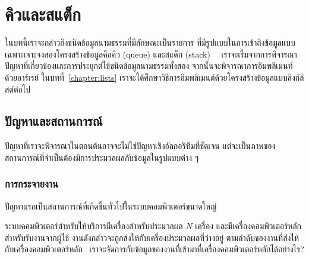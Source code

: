 \chapter{คิว{\wbr}และ{\wbr}สแต็ก}

ใน{\wbr}บท{\wbr}นี้{\wbr}เรา{\wbr}จะ{\wbr}กล่าว{\wbr}ถึง{\wbr}ชนิด{\wbr}ข้อมูล{\wbr}นามธรรม{\wbr}ที่{\wbr}มี{\wbr}ลักษณะ{\wbr}เป็น{\wbr}รายการ{\wbr}
ที่{\wbr}มี{\wbr}รูปแบบ{\wbr}ใน{\wbr}การ{\wbr}เข้าถึง{\wbr}ข้อมูล{\wbr}แบบ{\wbr}เฉพาะเจาะจง{\wbr}สอง{\wbr}โครงสร้าง{\wbr}ข้อมูล{\wbr}คือ{\wbr}คิว (queue) และ{\wbr}สแด็ก
(stack) \ \
เรา{\wbr}จะ{\wbr}เริ่ม{\wbr}จาก{\wbr}การ{\wbr}พิจารณา{\wbr}ปัญหา{\wbr}ที่{\wbr}เกี่ยวข้อง{\wbr}และ{\wbr}การ{\wbr}ประยุกต์{\wbr}ใช้{\wbr}ชนิด{\wbr}ข้อมูล{\wbr}นามธรรม{\wbr}ทั้ง{\wbr}สอง{\wbr}
จากนั้น{\wbr}จะ{\wbr}พิจารณา{\wbr}การ{\wbr}อิม{\wbr}พลี{\wbr}เมนท์{\wbr}ด้วย{\wbr}อาร์เรย์ ใน{\wbr}บท{\wbr}ที่~\ref{chapter:lists}
เรา{\wbr}จะ{\wbr}ได้{\wbr}ศึกษา{\wbr}วิธีการ{\wbr}อิม{\wbr}พลี{\wbr}เมนต์{\wbr}ด้วย{\wbr}โครงสร้าง{\wbr}ข้อมูล{\wbr}แบบ{\wbr}ลิงก์ลิสต์{\wbr}ต่อไป{\wbr}

\section{ปัญหา{\wbr}และ{\wbr}สถานการณ์}

ปัญหา{\wbr}ที่{\wbr}เรา{\wbr}จะ{\wbr}พิจารณา{\wbr}ใน{\wbr}ตอน{\wbr}ต้น{\wbr}อาจ{\wbr}จะ{\wbr}ไม่{\wbr}ใช่{\wbr}ปัญหา{\wbr}เชิง{\wbr}อัล{\wbr}กอ{\wbr}ริ{\wbr}ทึม{\wbr}ที่{\wbr}ชัดเจน แต่{\wbr}จะ{\wbr}เป็น{\wbr}ภาพ{\wbr}ของ{\wbr}สถานการณ์{\wbr}ที่{\wbr}จำเป็น{\wbr}ต้อง{\wbr}มี{\wbr}การ{\wbr}ประมวลผล{\wbr}กับ{\wbr}ข้อมูล{\wbr}ใน{\wbr}รูปแบบ{\wbr}ต่าง ๆ 

\subsection{การ{\wbr}กระจาย{\wbr}งาน}

ปัญหา{\wbr}แรก{\wbr}เป็น{\wbr}สถานการณ์{\wbr}ที่{\wbr}เกิด{\wbr}ขึ้น{\wbr}ทั่วไป{\wbr}ใน{\wbr}ระบบ{\wbr}คอมพิวเตอร์{\wbr}ขนาด{\wbr}ใหญ่{\wbr}

\framed\noindent
ระบบ{\wbr}คอมพิวเตอร์{\wbr}สำหรับ{\wbr}ให้{\wbr}บริการ{\wbr}มี{\wbr}เครื่อง{\wbr}สำหรับ{\wbr}ประมวลผล $N$ เครื่อง{\wbr}
และ{\wbr}มี{\wbr}เครื่อง{\wbr}คอมพิวเตอร์{\wbr}หลัก{\wbr}สำหรับ{\wbr}รับ{\wbr}งาน{\wbr}จาก{\wbr}ผู้ใช้{\wbr}
งาน{\wbr}ดังกล่าว{\wbr}จะ{\wbr}ถูก{\wbr}ส่ง{\wbr}ให้{\wbr}กับ{\wbr}เครื่อง{\wbr}ประมวลผล{\wbr}ที่{\wbr}ว่าง{\wbr}อยู่{\wbr}
ตาม{\wbr}ลำดับ{\wbr}ของ{\wbr}งาน{\wbr}ที่{\wbr}ส่ง{\wbr}ให้{\wbr}กับ{\wbr}เครื่อง{\wbr}คอมพิวเตอร์{\wbr}หลัก{\wbr}
\ เรา{\wbr}จะ{\wbr}จัดการ{\wbr}กับ{\wbr}ข้อมูล{\wbr}ของ{\wbr}งาน{\wbr}ที่{\wbr}เข้า{\wbr}มา{\wbr}ที่{\wbr}เครื่อง{\wbr}คอมพิวเตอร์{\wbr}หลัก{\wbr}ได้{\wbr}อย่างไร?
\endframed


